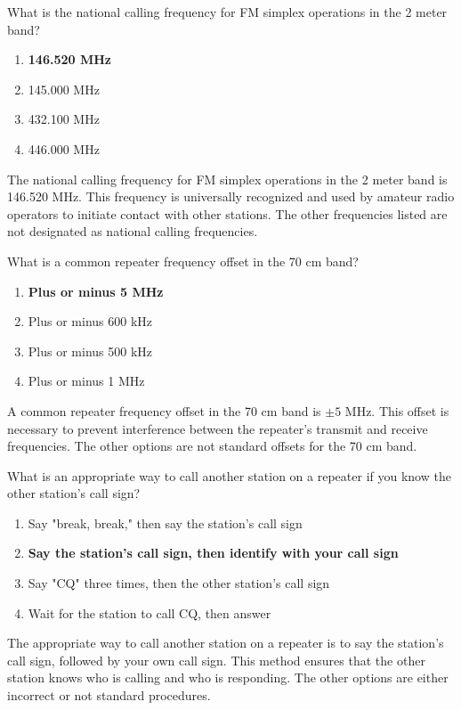 \begin{tcolorbox}[colback=gray!10!white,colframe=black!75!black,title={T2A02}]
What is the national calling frequency for FM simplex operations in the 2 meter band?
\begin{enumerate}[label=\Alph*),noitemsep]
    \item \textbf{146.520 MHz}
    \item 145.000 MHz
    \item 432.100 MHz
    \item 446.000 MHz
\end{enumerate}
\end{tcolorbox}
The national calling frequency for FM simplex operations in the 2 meter band is 146.520 MHz. This frequency is universally recognized and used by amateur radio operators to initiate contact with other stations. The other frequencies listed are not designated as national calling frequencies.

\begin{tcolorbox}[colback=gray!10!white,colframe=black!75!black,title={T2A03}]
What is a common repeater frequency offset in the 70 cm band?
\begin{enumerate}[label=\Alph*),noitemsep]
    \item \textbf{Plus or minus 5 MHz}
    \item Plus or minus 600 kHz
    \item Plus or minus 500 kHz
    \item Plus or minus 1 MHz
\end{enumerate}
\end{tcolorbox}
A common repeater frequency offset in the 70 cm band is $\pm 5$ MHz. This offset is necessary to prevent interference between the repeater's transmit and receive frequencies. The other options are not standard offsets for the 70 cm band.

\begin{tcolorbox}[colback=gray!10!white,colframe=black!75!black,title={T2A04}]
What is an appropriate way to call another station on a repeater if you know the other station's call sign?
\begin{enumerate}[label=\Alph*),noitemsep]
    \item Say "break, break," then say the station's call sign
    \item \textbf{Say the station's call sign, then identify with your call sign}
    \item Say "CQ" three times, then the other station's call sign
    \item Wait for the station to call CQ, then answer
\end{enumerate}
\end{tcolorbox}
The appropriate way to call another station on a repeater is to say the station's call sign, followed by your own call sign. This method ensures that the other station knows who is calling and who is responding. The other options are either incorrect or not standard procedures.

